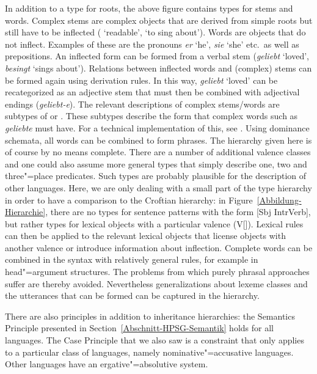 In addition to a type for roots, the above figure contains types for stems and words. Complex stems are complex objects that are
derived from simple roots but still have to be inflected ( `readable', 
`to sing about'). Words are objects that do not inflect. Examples of these
are the pronouns \emph{er} `he', \emph{sie} `she' etc.\ as well as prepositions. An inflected form can be formed from a verbal stem
(\emph{geliebt} `loved', \emph{besingt} `sings about'). Relations between inflected words and (complex) stems can be formed again using derivation rules. 
In this way, \emph{geliebt} `loved' can be recategorized as an adjective stem that must then be combined with adjectival endings (\emph{geliebt-e}).
The relevant descriptions of complex stems/words are subtypes of 
or . These subtypes describe the form that complex words such as \emph{geliebte} must have. For a technical implementation of this, see
. Using dominance schemata, all words can be combined to form phrases. The hierarchy given here is of course by no means complete.
There are a number of additional valence classes and one could also assume more general types that simply describe one, two and three"=place predicates. 
Such types are probably plausible for the description of other languages. Here, we are only dealing with a small part of the type hierarchy in order to have
a comparison to the Croftian hierarchy: in Figure~\ref{Abbildung-Hierarchie}, there are no types for
sentence patterns with the form
[Sbj IntrVerb], but rather types for lexical objects with a particular valence
(V[\comps {}]). Lexical rules can then be applied to the relevant lexical objects that license objects with another valence or introduce
information about inflection. Complete words can be combined in the syntax with relatively general rules, for example in head"=argument structures. The problems
from which purely phrasal approaches suffer are thereby avoided. Nevertheless generalizations about lexeme classes and the utterances that can be formed can be
captured in the hierarchy.

There are also principles in addition to inheritance hierarchies: the Semantics Principle presented in Section~\ref{Abschnitt-HPSG-Semantik} holds
for all languages. The Case Principle that we also saw is a constraint that only applies to a particular
class of languages, namely nominative"=accusative languages.
Other languages have an ergative"=absolutive system.

